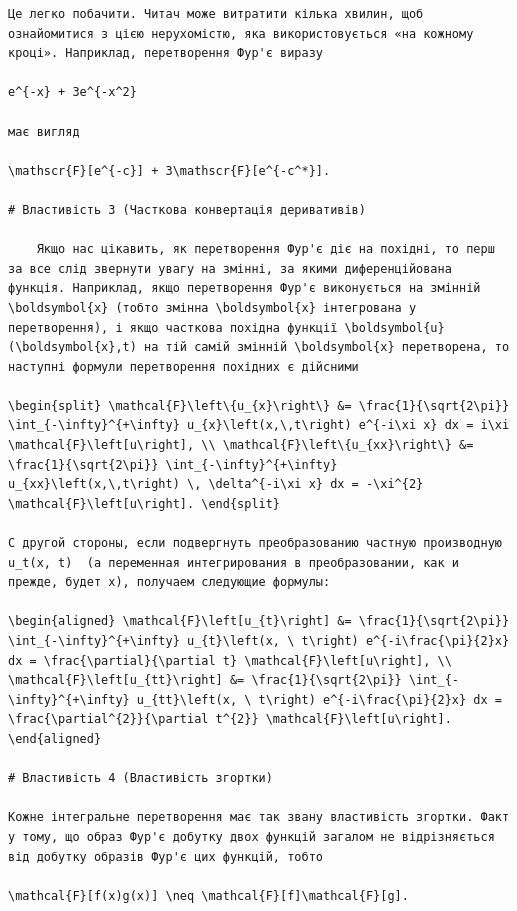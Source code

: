 \documentclass[
  ukrainian,
]{article}
\begin{document}
\begin{verbatim}
Це легко побачити. Читач може витратити кілька хвилин, щоб ознайомитися з цією нерухомістю, яка використовується «на кожному кроці». Наприклад, перетворення Фур'є виразу

e^{-x} + 3e^{-x^2}

має вигляд

\mathscr{F}[e^{-c}] + 3\mathscr{F}[e^{-c^*}].

# Властивість 3 (Часткова конвертація деривативів)

    Якщо нас цікавить, як перетворення Фур'є діє на похідні, то перш за все слід звернути увагу на змінні, за якими диференційована функція. Наприклад, якщо перетворення Фур'є виконується на змінній \boldsymbol{x} (тобто змінна \boldsymbol{x} інтегрована у перетворення), і якщо часткова похідна функції \boldsymbol{u}(\boldsymbol{x},t) на тій самій змінній \boldsymbol{x} перетворена, то наступні формули перетворення похідних є дійсними

\begin{split} \mathcal{F}\left\{u_{x}\right\} &= \frac{1}{\sqrt{2\pi}} \int_{-\infty}^{+\infty} u_{x}\left(x,\,t\right) e^{-i\xi x} dx = i\xi \mathcal{F}\left[u\right], \\ \mathcal{F}\left\{u_{xx}\right\} &= \frac{1}{\sqrt{2\pi}} \int_{-\infty}^{+\infty} u_{xx}\left(x,\,t\right) \, \delta^{-i\xi x} dx = -\xi^{2} \mathcal{F}\left[u\right]. \end{split}

С другой стороны, если подвергнуть преобразованию частную производную  u_t(x, t)  (а переменная интегрирования в преобразовании, как и прежде, будет x), получаем следующие формулы:

\begin{aligned} \mathcal{F}\left[u_{t}\right] &= \frac{1}{\sqrt{2\pi}} \int_{-\infty}^{+\infty} u_{t}\left(x, \ t\right) e^{-i\frac{\pi}{2}x} dx = \frac{\partial}{\partial t} \mathcal{F}\left[u\right], \\ \mathcal{F}\left[u_{tt}\right] &= \frac{1}{\sqrt{2\pi}} \int_{-\infty}^{+\infty} u_{tt}\left(x, \ t\right) e^{-i\frac{\pi}{2}x} dx = \frac{\partial^{2}}{\partial t^{2}} \mathcal{F}\left[u\right]. \end{aligned}

# Властивість 4 (Властивість згортки)

Кожне інтегральне перетворення має так звану властивість згортки. Факт у тому, що образ Фур'є добутку двох функцій загалом не відрізняється від добутку образів Фур'є цих функцій, тобто

\mathcal{F}[f(x)g(x)] \neq \mathcal{F}[f]\mathcal{F}[g].


\end{verbatim}
\end{document}

